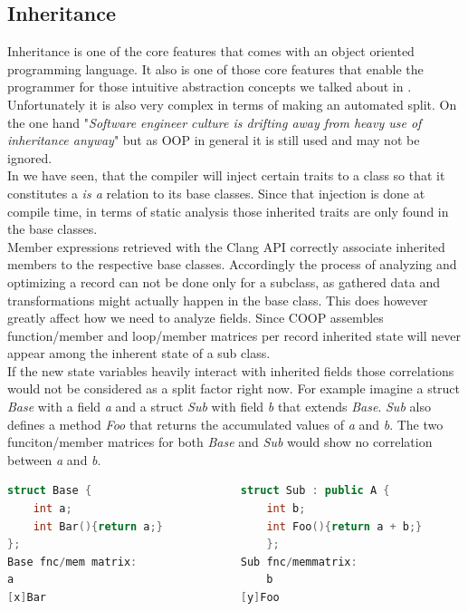 \subsection{Inheritance}
Inheritance is one of the core features that comes with an object oriented programming language. It also is one of those core features that enable the programmer for those intuitive abstraction concepts we talked about in .\\
Unfortunately it is also very complex in terms of making an automated split. On the one hand "\textit{Software engineer culture is drifting away from heavy use of inheritance anyway}"  but as OOP in general it is still used and may not be ignored.\\
In  we have seen, that the compiler will inject certain traits to a class so that it constitutes a \textit{is a} relation to its base classes. Since that injection is done at compile time, in terms of static analysis those inherited traits are only found in the base classes.\\
Member expressions retrieved with the Clang API correctly associate inherited members to the respective base classes. Accordingly the process of analyzing and optimizing a record can not be done only for a subclass, as gathered data and transformations might actually happen in the base class. This does however greatly affect how we need to analyze fields. Since COOP assembles function/member and loop/member matrices per record inherited state will never appear among the inherent state of a sub class.\\
If the new state variables heavily interact with inherited fields those correlations would not be considered as a split factor right now. For example imagine a struct \textit{Base} with a field \textit{a} and a struct \textit{Sub} with field \textit{b} that extends \textit{Base}. \textit{Sub} also defines a method \textit{Foo} that returns the accumulated values of \textit{a} and \textit{b}. The two funciton/member matrices for both \textit{Base} and \textit{Sub} would show no correlation between \textit{a} and \textit{b}.
\begin{lstlisting}[language=C++, name={Function/Member matrices for classes related by inheritance.}, label={inheritance_fmm}]
struct Base {						struct Sub : public A {
	int a;								int b;
	int Bar(){return a;}				int Foo(){return a + b;}
};										};
Base fnc/mem matrix:				Sub fnc/memmatrix:
a										b
[x]Bar								[y]Foo
\end{lstlisting}
